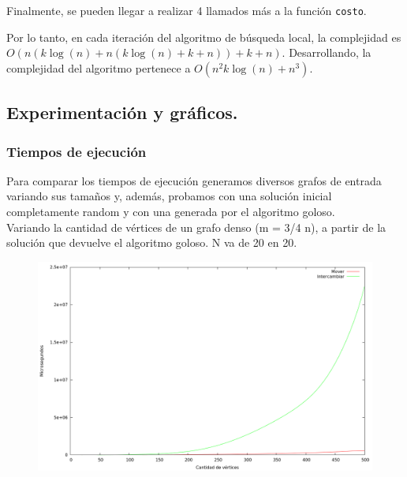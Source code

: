 Finalmente, se pueden llegar a realizar 4 llamados más a la función
\texttt{costo}.

Por lo tanto, en cada iteración del algoritmo de búsqueda local, la complejidad
es $O(n (k\log(n) + n (k\log(n) + k + n)) + k + n)$. Desarrollando, la
complejidad del algoritmo pertenece a $O(n^2k\log(n) + n^3)$.


\newpage \subsection{Experimentación y gráficos.}

\subsubsection{Tiempos de ejecución}

Para comparar los tiempos de ejecución generamos diversos grafos de entrada
variando sus tamaños y, además, probamos con una solución inicial completamente
random y con una generada por el algoritmo goloso.
\\

Variando la cantidad de vértices de un grafo denso (m = 3/4 n), a partir de la
solución que devuelve el algoritmo goloso. N va de 20 en 20.
\vspace*{0.5cm}

\begin{figure}[h]
  \begin{center}
    \includegraphics[scale=0.35]{imagenes/local-goloso-n-tiempo.png}
  \end{center}
\end{figure}

\vspace*{0.5cm}

